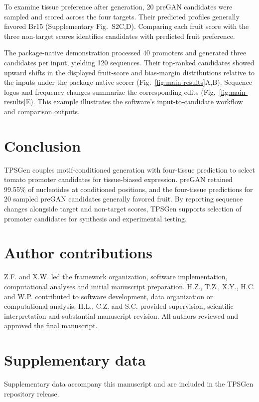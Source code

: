 \documentclass[namedate,webpdf,modern,large]{oup-authoring-template}
\begin{document}
To examine tissue preference after generation, 20 preGAN candidates were sampled and scored across the four targets. Their predicted profiles generally favored Br15 (Supplementary Fig.~S2C,D). Comparing each fruit score with the three non-target scores identifies candidates with predicted fruit preference.

The package-native demonstration processed 40 promoters and generated three candidates per input, yielding 120 sequences. Their top-ranked candidates showed upward shifts in the displayed
fruit-score and bias-margin distributions relative to the inputs under
the package-native scorer (Fig.~\ref{fig:main-results}A,B). Sequence logos and frequency changes summarize the corresponding edits (Fig.~\ref{fig:main-results}E). This example illustrates the software's input-to-candidate workflow and comparison outputs.

\section{Conclusion}

TPSGen couples motif-conditioned generation with four-tissue prediction to select tomato promoter candidates for tissue-biased expression. preGAN retained 99.55\% of nucleotides at conditioned positions, and the four-tissue predictions for 20 sampled preGAN candidates generally favored fruit. By reporting sequence changes alongside target and non-target scores, TPSGen supports selection of promoter candidates for synthesis and experimental testing.

\section*{Author contributions}

Z.F. and X.W. led the framework organization, software implementation, computational analyses and initial manuscript preparation. H.Z., T.Z., X.Y., H.C. and W.P. contributed to software development, data organization or computational analysis. H.L., C.Z. and S.C. provided supervision, scientific interpretation and substantial manuscript revision. All authors reviewed and approved the final manuscript.

\section*{Supplementary data}

Supplementary data accompany this manuscript and are included in the TPSGen repository release.
\end{document}
